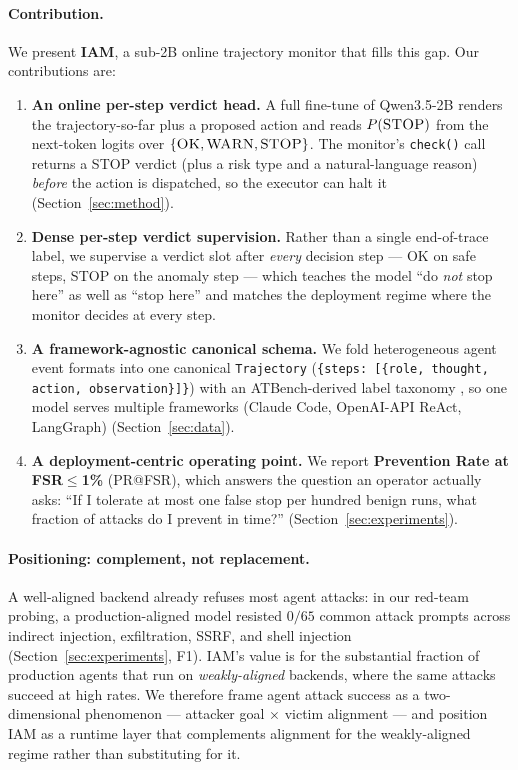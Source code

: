 \paragraph{Contribution.}
We present \textbf{IAM}, a sub-2B online trajectory monitor that fills
this gap. Our contributions are:
\begin{enumerate}[leftmargin=1.4em,itemsep=0.15em]
  \item \textbf{An online per-step verdict head.} A full fine-tune of
        Qwen3.5-2B renders the trajectory-so-far plus a proposed action and
        reads $P(\textsc{STOP})$ from the next-token logits over
        $\{\textsc{OK},\textsc{WARN},\textsc{STOP}\}$. The monitor's
        \texttt{check()} call returns a \textsc{STOP} verdict (plus a risk type
        and a natural-language reason) \emph{before} the action is dispatched,
        so the executor can halt it (Section~\ref{sec:method}).
  \item \textbf{Dense per-step verdict supervision.} Rather than a single
        end-of-trace label, we supervise a verdict slot after \emph{every}
        decision step --- \textsc{OK} on safe steps, \textsc{STOP} on the
        anomaly step --- which teaches the model ``do \emph{not} stop here'' as
        well as ``stop here'' and matches the deployment regime where the
        monitor decides at every step.
  \item \textbf{A framework-agnostic canonical schema.} We fold heterogeneous
        agent event formats into one canonical \texttt{Trajectory}
        (\texttt{\{steps: [\{role, thought, action, observation\}]\}}) with an
        ATBench-derived label taxonomy \citep{atbench}, so one model serves
        multiple frameworks (Claude Code, OpenAI-API ReAct, LangGraph)
        (Section~\ref{sec:data}).
  \item \textbf{A deployment-centric operating point.} We report
        \textbf{Prevention Rate at FSR$\le$1\%} (PR@FSR), which answers the
        question an operator actually asks: ``If I tolerate at most one false
        stop per hundred benign runs, what fraction of attacks do I prevent in
        time?'' (Section~\ref{sec:experiments}).
\end{enumerate}

\paragraph{Positioning: complement, not replacement.}
A well-aligned backend already refuses most agent attacks: in our red-team
probing, a production-aligned model resisted $0/65$ common attack prompts
across indirect injection, exfiltration, SSRF, and shell injection
(Section~\ref{sec:experiments}, F1). IAM's value is for the substantial
fraction of production agents that run on \emph{weakly-aligned} backends, where
the same attacks succeed at high rates. We therefore frame agent attack success
as a two-dimensional phenomenon --- attacker goal $\times$ victim alignment ---
and position IAM as a runtime layer that complements alignment for the
weakly-aligned regime rather than substituting for it.

